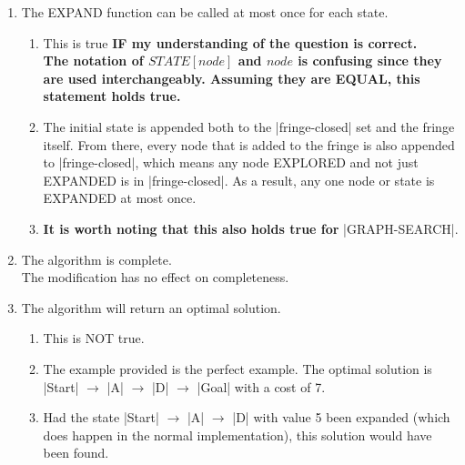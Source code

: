 \documentclass{homework}
\begin{document}
\begin{enumerate}
    \item {\color{green} The EXPAND function can be called at most once for each state.}
    \begin{enumerate}
        \item {\color{green} This is true \textbf{IF my understanding of the question is correct.}}\\
        \textbf{The notation of $STATE[node]$ and $node$ is confusing since they are used interchangeably. Assuming they are EQUAL, this statement holds true.}
        \item The initial state is appended both to the \cverb|fringe-closed| set and the fringe itself. From there, every node that is added to the fringe is also appended to \cverb|fringe-closed|, which means any node EXPLORED and not just EXPANDED is in \cverb|fringe-closed|. As a result, any one node or state is EXPANDED at most once.
        \item \textbf{It is worth noting that this also holds true for} \cverb|GRAPH-SEARCH|.
    \end{enumerate}
    \item {\color{green} The algorithm is complete.}\\
    \indent The modification has no effect on completeness.
    \item {\color{red} The algorithm will return an optimal solution.}
    \begin{enumerate}
        \item {\color{red} This is NOT true.}
        \item The example provided is the perfect example. The optimal solution is \cverb|Start| $\xrightarrow{}$ \cverb|A| $\xrightarrow{}$ \cverb|D| $\xrightarrow{}$ \cverb|Goal| with a cost of 7.
        \item Had the state \cverb|Start| $\xrightarrow{}$ \cverb|A| $\xrightarrow{}$ \cverb|D| with value 5 been expanded (which does happen in the normal implementation), this solution would have been found.
    \end{enumerate}
\end{enumerate}
\end{document}
